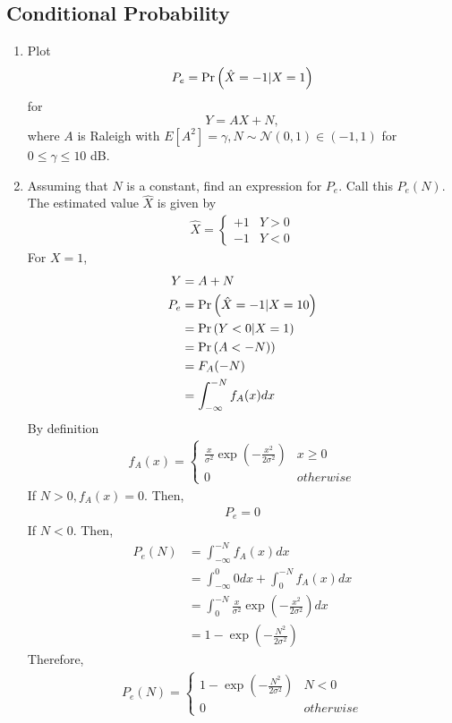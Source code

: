 \documentclass[10pt, a4paper]{article}
\providecommand{\sbrak}[1]{\ensuremath{{}\left[#1\right]}}
\providecommand{\brak}[1]{\ensuremath{\left(#1\right)}}
\begin{document}
\subsection{Conditional Probability}
\begin{enumerate}
\item
\label{ch4_sim}
Plot 
\begin{equation}
P_e = \Pr\left(\hat{X} = -1|X=1\right)
\end{equation}
%
for 
\begin{equation}
Y = AX+N,
\end{equation}
where $A$ is Raleigh with $E\sbrak{A^2} = \gamma, N \sim \mathcal{N}(0,1) \in \brak{-1,1}$ for $0 \le \gamma \le 10$ dB.
\\


%
\item
Assuming that $N$ is a constant, find an expression for $P_e$.  Call this $P_e(N)$.
\\
\solution
The estimated value $\hat{X}$ is given by
\begin{align}
\hat{X} = 
\begin{cases}
+1 & Y>0\\
-1 & Y<0
\end{cases}
\end{align}
For $X = 1$, 
\begin{align}
Y &= A + N\\
P_e &= \Pr\left(\hat{X} = -1|X=10\right) \\
&=\Pr\left(Y<0 |X=1\right)\\
&= \Pr\left(A<-N)\right)\\
&= F_A(-N)\\
&= \int_{-\infty}^{-N} f_A(x)dx
\end{align}
By definition
\begin{align}
f_A(x) = 
\begin{cases}
\frac{x}{\sigma^2}\exp\brak{{-\frac{x^2}{2\sigma^2}}} & x\geq0\\
0 & otherwise
\end{cases}
\end{align}
If $N>0, f_A(x) = 0$. Then,
\begin{align}
 P_e=0  
\end{align}
If $N<0$. Then,
\begin{align}
 P_e(N) &=\int_{-\infty}^{-N} f_A(x)dx\\
 &=\int_{-\infty}^{0} 0dx+\int_{0}^{-N} f_A(x)dx\\
 &=\int_{0}^{-N} \frac{x}{\sigma^2}\exp\brak{{-\frac{x^2}{2\sigma^2}}}dx\\
 &=1-\exp{\brak{-\frac{N^2}{2\sigma^2}}}
\end{align}
Therefore,
\begin{align}\label{pe(N)}
P_e(N) = 
\begin{cases}
1-\exp\brak{{-\frac{N^2}{2\sigma^2}}} & N<0\\
0 & otherwise
\end{cases}
\end{align}
%


\end{enumerate}
\end{document}

